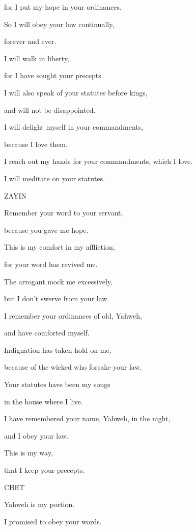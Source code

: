 {\par }{\QB for I put my hope in your ordinances.
\par }{\Q {}So I will obey your law continually,
\par }{\QB forever and ever.
\par }{\Q {}I will walk in liberty,
\par }{\QB for I have sought your precepts.
\par }{\Q {}I will also speak of your statutes before kings,
\par }{\QB and will not be disappointed.
\par }{\Q {}I will delight myself in your commandments,
\par }{\QB because I love them.
\par }{\Q {}I reach out my hands for your commandments, which I love.
\par }{\QB I will meditate on your statutes.
\par }{\D ZAYIN
\par }{\Q {}Remember your word to your servant,
\par }{\QB because you gave me hope.
\par }{\Q {}This is my comfort in my affliction,
\par }{\QB for your word has revived me.
\par }{\Q {}The arrogant mock me excessively,
\par }{\QB but I don’t swerve from your law.
\par }{\Q {}I remember your ordinances of old, Yahweh,
\par }{\QB and have comforted myself.
\par }{\Q {}Indignation has taken hold on me,
\par }{\QB because of the wicked who forsake your law.
\par }{\Q {}Your statutes have been my songs
\par }{\QB in the house where I live.
\par }{\Q {}I have remembered your name, Yahweh, in the night,
\par }{\QB and I obey your law.
\par }{\Q {}This is my way,
\par }{\QB that I keep your precepts.
\par }{\D CHET
\par }{\Q {}Yahweh is my portion.
\par }{\QB I promised to obey your words.
}
